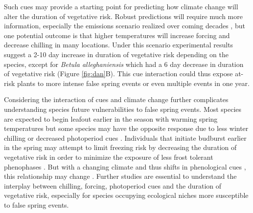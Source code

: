 \documentclass{article}\usepackage[]{graphicx}\usepackage[]{color}
\begin{document}
Such cues may provide a starting point for predicting how climate change will alter the duration of vegetative risk. Robust predictions will require much more information, especially the emissions scenario realized over coming decades \citep{IPCC2014}, but one potential outcome is that higher temperatures will increase forcing and decrease chilling in many locations. Under this scenario experimental results suggest a 2-10 day increase in duration of vegetative risk depending on the species, except for \textit{Betula alleghaniensis} which had a 6 day decrease in duration of vegetative risk (Figure \ref{fig:dan}B).
This cue interaction could thus expose at-risk plants to more intense false spring events or even multiple events in one year. 

Considering the interaction of cues and climate change further complicates understanding species future vulnerabilities to false spring events. Most species are expected to begin leafout earlier in the season with warming spring temperatures but some species may have the opposite response due to less winter chilling or decreased photoperiod cues \citep{Cleland2006, Fu2015, Xin2016}. %
Individuals that initiate budburst earlier in the spring may attempt to limit freezing risk by decreasing the duration of vegetative risk in order to minimize the exposure of less frost tolerant phenophases \citep{Augspurger2009}. But with a changing climate and thus shifts in phenological cues%
, this relationship may change \citep{Dolezal2016}. Further studies are essential to understand the interplay between chilling, forcing, photoperiod cues and the duration of vegetative risk, especially for species occupying ecological niches more susceptible to false spring events. 


\end{document}
